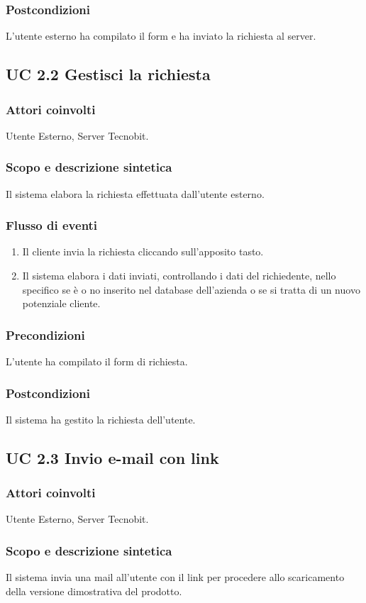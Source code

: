 \subsubsection*{Postcondizioni} L'utente esterno ha compilato il form e ha inviato la richiesta al server.

\subsection*{UC 2.2 Gestisci la richiesta}
\subsubsection*{Attori coinvolti} Utente Esterno, Server Tecnobit.
\subsubsection*{Scopo e descrizione sintetica}
Il sistema elabora la richiesta effettuata dall'utente esterno.
\subsubsection*{Flusso di eventi}
\begin{enumerate}
\item Il cliente invia la richiesta cliccando sull'apposito tasto.
\item Il sistema elabora i dati inviati, controllando i dati del richiedente, nello specifico se \`e o no inserito nel database dell'azienda o se si tratta di un nuovo potenziale cliente.
\end{enumerate}
\subsubsection*{Precondizioni} L'utente ha compilato il form di richiesta.
\subsubsection*{Postcondizioni} Il sistema ha gestito la richiesta dell'utente.

\subsection*{UC 2.3 Invio e-mail con link}
\subsubsection*{Attori coinvolti} Utente Esterno, Server Tecnobit.
\subsubsection*{Scopo e descrizione sintetica}
Il sistema invia una mail all'utente con il link per procedere allo scaricamento della versione dimostrativa del prodotto.
